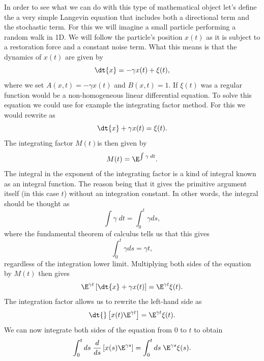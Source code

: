 In order to see what we can do with this type of mathematical object let's
define the a very simple Langevin equation that includes both a directional
term and the stochastic term. For this we will imagine a small particle
performing a random walk in 1D. We will follow the particle's position $x(t)$
as it is subject to a restoration force and a constant noise term. What this
means is that the dynamics of $x(t)$ are given by
\begin{equation}
  \dt{x} = -\gamma x(t) + \xi(t),
  \label{eq_random_walk_langevin}
\end{equation}
where we set $A(x, t) = -\gamma x(t)$ and $B(x, t) = 1$. If $\xi(t)$ was a
regular function  would be a non-homogeneous
linear differential equation. To solve this equation we could use for example
the integrating factor method. For this we would rewrite
 as
\begin{equation}
  \dt{x} + \gamma x(t) = \xi(t).
\end{equation}
The integrating factor $M(t) $is then given by
\begin{equation}
  M(t) = \E^{\int \gamma \; dt}.
\end{equation}
The integral in the exponent of the integrating factor is a kind of integral
known as an integral function. The reason being that it gives the primitive
argument itself (in this case $t$) without an integration constant. In other
words, the integral should be thought as
\begin{equation}
  \int \gamma \; dt = \int_0^t \gamma ds,
\end{equation}
where the fundamental theorem of calculus tells us that this gives
\begin{equation}
  \int_0^t \gamma ds = \gamma t,
\end{equation}
regardless of the integration lower limit. Multiplying both sides of the
equation by $M(t)$ then gives
\begin{equation}
  \E^{\gamma t} \left[ \dt{x} + \gamma x(t) \right] =
  \E^{\gamma t} \xi(t).
\end{equation}
The integration factor allows us to rewrite the left-hand side as
\begin{equation}
  \dt{}\left[ x(t) \E^{\gamma t} \right] = 
  \E^{\gamma t} \xi(t).
\end{equation}
We can now integrate both sides of the equation from 0 to $t$ to obtain
\begin{equation}
  \int_0^t ds\; {d \over ds}\left[ x(s) \E^{\gamma s} \right] =
  \int_0^t ds \; \E^{\gamma s} \xi(s).
\end{equation}
